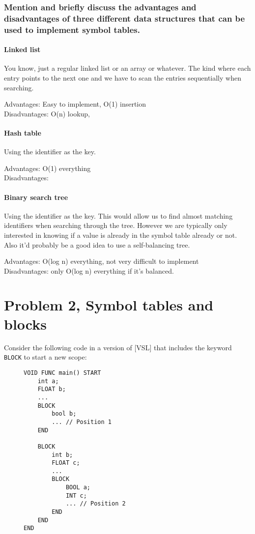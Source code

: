 \subsubsection{Mention and briefly discuss the advantages and disadvantages of three different data structures that can be used to implement symbol tables.}
\paragraph{Linked list}

You know, just a regular linked list or an array or whatever.
The kind where each entry points to the next one and we have to scan the entries sequentially when searching.

Advantages: Easy to implement, O(1) insertion\\
Disadvantages: O(n) lookup, 


\paragraph{Hash table}

Using the identifier as the key.

Advantages: O(1) everything\\
Disadvantages: 

\paragraph{Binary search tree}

Using the identifier as the key.
This would allow us to find almost matching identifiers when searching through the tree.
However we are typically only interested in knowing if a value is already in the symbol table already or not.
Also it'd probably be a good idea to use a self-balancing tree.

Advantages: O(log n) everything, not very difficult to implement\\
Disadvantages: only O(log n) everything if it's balanced.

\newpage
\setcounter{subsubsection}{0}
\section{Problem 2, Symbol tables and blocks}
Consider the following code in a version of [VSL] that includes the keyword \texttt{BLOCK} to start a new scope:
\begin{figure}[H]
\begin{verbatim}
VOID FUNC main() START
    int a;
    FLOAT b;
    ...
    BLOCK
        bool b;
        ... // Position 1
    END

    BLOCK
        int b;
        FLOAT c;
        ...
        BLOCK
            BOOL a;
            INT c;
            ... // Position 2
        END
    END
END
\end{verbatim}
\end{figure}

